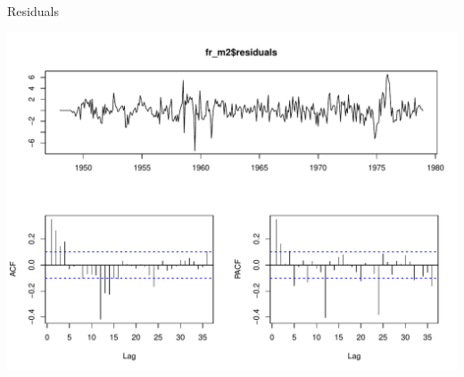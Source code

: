 \documentclass[11pt,ignorenonframetext,]{beamer}
\begin{document}
\begin{frame}{Residuals}

\includegraphics{Lec11_files/figure-beamer/unnamed-chunk-16-1.pdf}

\end{frame}
\end{document}

